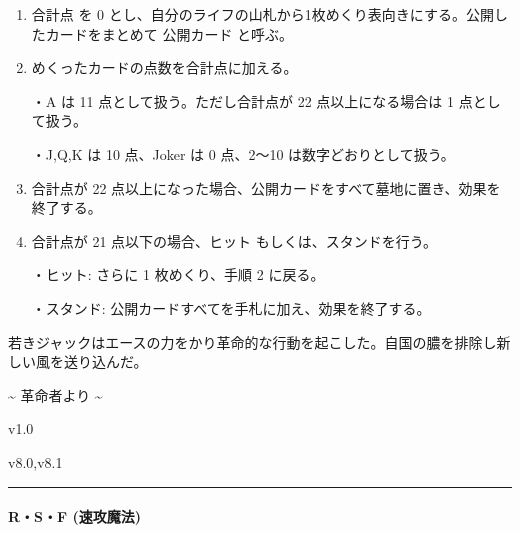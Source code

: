 \documentclass[letterpaper,10pt,dvipdfmx]{sphinxmanual}
\begin{document}
\sphinxAtStartPar
{}
\begin{enumerate}
%
\item {} 
\sphinxAtStartPar
合計点 を 0 とし、自分のライフの山札から1枚めくり表向きにする。公開したカードをまとめて 公開カード と呼ぶ。

\item {} 
\sphinxAtStartPar
めくったカードの点数を合計点に加える。

\sphinxAtStartPar
・A は 11 点として扱う。ただし合計点が 22 点以上になる場合は 1 点として扱う。

\sphinxAtStartPar
・J,Q,K は 10 点、Joker は 0 点、2〜10 は数字どおりとして扱う。

\item {} 
\sphinxAtStartPar
合計点が 22 点以上になった場合、公開カードをすべて墓地に置き、効果を終了する。

\item {} 
\sphinxAtStartPar
合計点が 21 点以下の場合、ヒット もしくは、スタンドを行う。

\sphinxAtStartPar
・ヒット: さらに 1 枚めくり、手順 2 に戻る。

\sphinxAtStartPar
・スタンド: 公開カードすべてを手札に加え、効果を終了する。

\end{enumerate}

\sphinxAtStartPar
{}

\sphinxAtStartPar
若きジャックはエースの力をかり革命的な行動を起こした。自国の膿を排除し新しい風を送り込んだ。

\sphinxAtStartPar
{}

\sphinxAtStartPar
{}

\sphinxAtStartPar
\textasciitilde{} 革命者より \textasciitilde{}

\sphinxAtStartPar
{}  v1.0

\sphinxAtStartPar
{}  v8.0,v8.1


\bigskip\hrule\bigskip



\paragraph{R・S・F (速攻魔法)}
\label{\detokenize{auto/actionlist:rsf}}\label{\detokenize{auto/actionlist:act-rsf}}
\sphinxAtStartPar
{}
\end{document}
